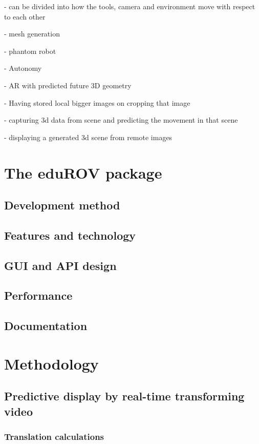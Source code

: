 \documentclass[b5paper,10pt,twoside]{book}
\begin{document}
{{	- can be divided into how the tools, camera and environment move with respect to each other
	
	- mesh generation
	
	- phantom robot
	
	- Autonomy

	- AR with predicted future 3D geometry
	
	- Having stored local bigger images on cropping that image
	
	- capturing 3d data from scene and predicting the movement in that scene
	
	- displaying a generated 3d scene from remote images
	}
	
\chapter{The eduROV package}
	\section{Development method}
	\section{Features and technology}
	\section{GUI and API design}
	\section{Performance}
	\section{Documentation}
	
\chapter{Methodology}
	\section{Predictive display by real-time transforming video}
		\subsection{Translation calculations}
}
\end{document}
